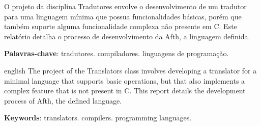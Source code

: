 \documentclass[
	article,			%
	11pt,				%
	oneside,			%
	a4paper,			%
	english,			%
	brazil,				%
	sumario=tradicional
	]{abntex2}
\begin{document}

\frenchspacing 


%
%

\maketitle





\begin{resumoumacoluna}
	O projeto da disciplina Tradutores envolve o desenvolvimento de
	um tradutor para uma linguagem mínima que possua funcionalidades
	básicas, porém que também suporte alguma funcionalidade complexa
	não presente em C. Este relatório detalha o processo de desenvolvimento
	da Afth, a linguagem definida.
	
	\vspace{\onelineskip}
	 
	\noindent
	\textbf{Palavras-chave}: tradutores. compiladores. linguagens de programação.
\end{resumoumacoluna}


\renewcommand{\resumoname}{Abstract}
\begin{resumoumacoluna}
	\begin{otherlanguage*}{english}
		The project of the Translators class involves developing a
		translator for a minimal language that supports basic operations,
		but that also implements a complex feature that is not present
		in C. This report details the development process of Afth, the defined
		language.
		\vspace{\onelineskip}
		 
		\noindent
		\textbf{Keywords}: translators. compilers. programming languages.
	\end{otherlanguage*}  
\end{resumoumacoluna}
\end{document}
